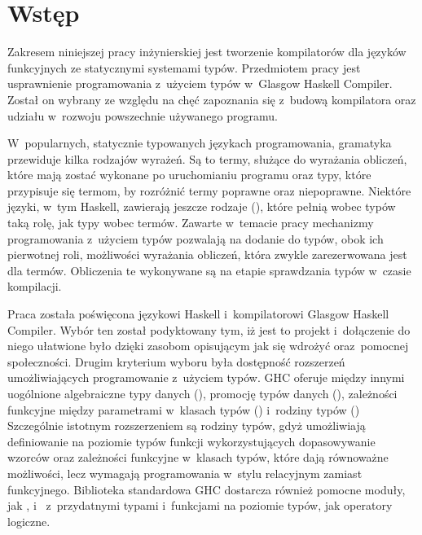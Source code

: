 \chapter{Wstęp}\label{chap:wstep}

Zakresem niniejszej pracy inżynierskiej jest
tworzenie kompilatorów dla języków funkcyjnych ze statycznymi systemami typów.
Przedmiotem pracy jest usprawnienie
programowania z~użyciem typów w~Glasgow Haskell Compiler.
Został on wybrany ze względu na chęć zapoznania się z~budową kompilatora oraz
udziału w~rozwoju powszechnie używanego programu.

W~popularnych, statycznie typowanych językach programowania, gramatyka przewiduje
kilka rodzajów wyrażeń. Są to termy, służące do wyrażania obliczeń, które mają zostać
wykonane po uruchomianiu programu oraz typy, które przypisuje się termom, by
rozróżnić termy poprawne oraz niepoprawne.
Niektóre języki, w~tym Haskell, zawierają jeszcze rodzaje (), które pełnią wobec
typów taką rolę, jak typy wobec termów. Zawarte w~temacie pracy mechanizmy programowania
z~użyciem typów pozwalają na dodanie do typów, obok ich pierwotnej roli, możliwości
wyrażania obliczeń, która zwykle zarezerwowana jest dla termów.
Obliczenia te wykonywane są na etapie sprawdzania typów w~czasie kompilacji.

Praca została poświęcona językowi Haskell i~kompilatorowi Glasgow Haskell
Compiler. Wybór ten został podyktowany tym, iż jest to projekt 
i~dołączenie do niego ułatwione było dzięki zasobom opisującym jak się wdrożyć
oraz~pomocnej społeczności.
Drugim kryterium wyboru była dostępność rozszerzeń umożliwiających
programowanie z~użyciem typów.
GHC oferuje między innymi uogólnione algebraiczne
typy danych (\cite{ExtPhantomTypes}\cite{ExtGADTs}),
promocję typów danych (\cite{ExtPromotion}),
zależności funkcyjne między parametrami w~klasach typów
(\cite{ExtFunDeps})
i~rodziny typów (\cite{ExtAssocTyFams}\cite{ExtAssocTypesWithClass}\cite{ExtClosedTyFams})
Szczególnie istotnym rozszerzeniem są rodziny typów, gdyż umożliwiają
definiowanie na poziomie typów funkcji wykorzystujących
dopasowywanie wzorców oraz zależności funkcyjne w~klasach typów,
które dają równoważne możliwości,
lecz wymagają programowania w~stylu relacyjnym zamiast funkcyjnego.
Biblioteka standardowa GHC dostarcza również pomocne moduły, jak ,
 i~ z~przydatnymi typami i~funkcjami na poziomie
typów, jak operatory logiczne.

